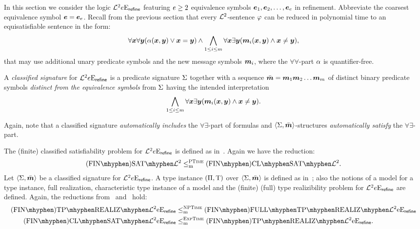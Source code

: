 In this section we consider the logic $\mathcal{L}^{2}_{{}}{e}\mathrm{E}_{\mathsf{refine}}$
featuring $e \geq 2$ equivalence symbols $\bm{e}_{1},\bm{e}_{2},\dots,\bm{e}_{e}$ in
refinement. Abbreviate the coarsest equivalence symbol $\bm{e} = \bm{e}_{e}$.
Recall from the previous section that every $\mathcal{L}^{2}$-sentence $\varphi$ can be
reduced in polynomial time to an equisatisfiable sentence in the form:
\begin{equation*}
  \forall\bm{x}\forall\bm{y} (\alpha(\bm{x},\bm{y}) \lor \bm{x} = \bm{y}) \land
  \bigwedge_{1 \leq i \leq m} \forall\bm{x}\exists\bm{y}
  (\bm{m}_{i}(\bm{x},\bm{y}) \land \bm{x} \neq \bm{y}),
\end{equation*}
that may use additional unary predicate symbols and the new message symbols
$\bm{m}_{i}$, where the $\forall\forall$-part $\alpha$ is quantifier-free.
\begin{definition}
A \emph{classified signature} for $\mathcal{L}^{2}_{{}}{e}\mathrm{E}_{\mathsf{refine}}$ is a
predicate signature $\mathrm{\Sigma}$ together with a sequence $\sms =
\smm1\smm2\dots\smm\nm$ of distinct binary predicate symbols \emph{distinct
from the equivalence symbols} from $\mathrm{\Sigma}$ having the intended interpretation
\begin{equation*}
  \bigwedge_{1 \leq i \leq m} \forall\bm{x}\exists\bm{y} 
  (\bm{m}_{i}(\bm{x},\bm{y}) \land \bm{x} \neq \bm{y}).
\end{equation*}
\end{definition}
Again, note that a classified signature \emph{automatically includes} the
$\forall\exists$-part of formulas and $\left\langle \mathrm{\Sigma},\bar{\bm{m}} \right\rangle$-structures
\emph{automatically satisfy} the $\forall\exists$-part.

The (finite) classified satisfiability problem for
$\mathcal{L}^{2}_{{}}{e}\mathrm{E}_{\mathsf{refine}}$ is defined as in~.
Again we have the reduction:
\[
  \FinASat{\vFo2} \red\cP \FinAClSat{\vFo2}.
\]
Let $\left\langle \mathrm{\Sigma},\bar{\bm{m}} \right\rangle$ be a classified signature for
$\mathcal{L}^{2}_{{}}{e}\mathrm{E}_{\mathsf{refine}}$.
A type instance $(\Pi,\mathrm{T})$ over $\left\langle \mathrm{\Sigma},\bar{\bm{m}} \right\rangle$ is defined as
in~; also the notions of a model for a type instance,
full realization, characteristic type instance of a model and the (finite)
(full) type realizibility problem for $\mathcal{L}^{2}_{{}}{e}\mathrm{E}_{\mathsf{refine}}$ are
defined. Again, the reductions from~
and~ hold:
\begin{align*}
  \FinAReal{\Lvp\Fo2\nopow\Eea\sze\agrefine} &\red\cNP 
  \FinAFullReal{\Lvp\Fo2\nopow\Eea\sze\agrefine} \\
  \FinAClSat{\Lvp\Fo2\nopow\Eea\sze\agrefine} &\red\cExpTime
  \FinAReal{\Lvp\Fo2\nopow\Eea\sze\agrefine}.
\end{align*}

